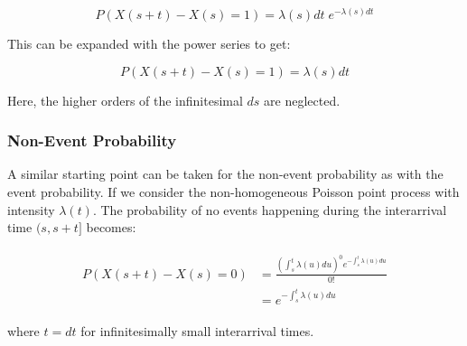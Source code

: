 \begin{equation}
    P(X(s+t) - X(s) = 1) = \lambda(s)dt \; e^{-\lambda(s)dt}
\end{equation}

This can be expanded with the power series to get:

\begin{equation}
    P(X(s+t) - X(s) = 1) = \lambda(s) dt
\end{equation}

Here, the higher orders of the infinitesimal $ds$ are neglected.


\subsubsection{Non-Event Probability}
\label{sec:Method:Possion:NonEventProbability}

A similar starting point can be taken for the non-event probability as with the event probability.
If we consider the non-homogeneous Poisson point process with intensity $\lambda(t)$. 
The probability of no events happening during the interarrival time $(s, s+t]$ becomes:

\begin{align}
\begin{split}
P(X(s+t) - X(s) = 0) &= \frac{\left(\int_s^t \lambda(u)du \right)^0 e^{- \int_s^t \lambda(u)du}}{0!}\\
&= e^{- \int_s^t \lambda(u)du}
\end{split}
\end{align}

where $t = dt$ for infinitesimally small interarrival times.
